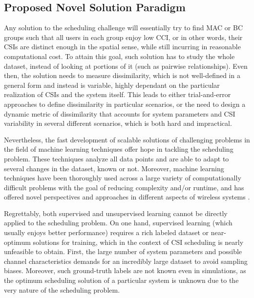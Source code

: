 


\subsection{Proposed Novel Solution Paradigm}

Any solution to the scheduling challenge will essentially try to find MAC or BC groups such that all users in each group enjoy low CCI, or in other words, their CSIs are distinct enough in the spatial sense, while still incurring in reasonable computational cost.  
To attain this goal, such solution has to study the whole dataset, instead of looking at portions of it (such as pairwise relationships). Even then, the solution needs to measure dissimilarity, which is not well-defined in a general form and instead is variable, highly dependant on the particular realization of CSIs and the system itself. This leads to either trial-and-error approaches to define dissimilarity in particular scenarios, or the need to design a dynamic metric of dissimilarity that accounts for system parameters and CSI variability in several different scenarios, which is both hard and impractical. 

Nevertheless, the fast development of scalable solutions of challenging problems in the field of machine learning techniques offer hope in tackling the scheduling problem. These techniques analyze all data points and are able to adapt to several changes in the dataset, known or not. Moreover, machine learning techniques have been thoroughly used across a large variety of computationally difficult problems with the goal of reducing complexity and/or runtime, and has offered novel perspectives and approaches in different aspects of wireless systems \cite{Jiang17, Kaufman90, Cui18, Morocho19, Xu14}. 

Regrettably, both supervised and unsupervised learning cannot be directly applied to the scheduling problem.
On one hand, supervised learning (which usually enjoys better performance) requires a rich labeled dataset or near-optimum solutions for training, which in the context of CSI scheduling is nearly unfeasible to obtain. First, the large number of system parameters and possible channel characteristics demands for an incredibly large dataset to avoid sampling biases. Moreover, such ground-truth labels are not known even in simulations, as the optimum scheduling solution of a particular system is unknown due to the very nature of the scheduling problem. 

